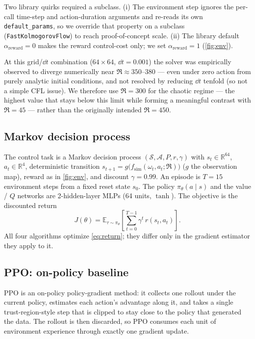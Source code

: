 Two library quirks required a subclass. (i) The environment step ignores the
per-call time-step and action-duration arguments and re-reads its own
\texttt{default\_params}, so we override that property on a subclass
(\texttt{FastKolmogorovFlow}) to reach proof-of-concept scale.
(ii) The library default $\alpha_{\text{reward}}=0$ makes the reward
control-cost only; we set $\alpha_{\text{reward}}=1$ (\cref{fig:env}).

At this grid/$\dd t$ combination ($64\times 64$, $\dd t=0.001$) the solver was
empirically observed to diverge numerically near $\Re\approx 350$--$380$ ---
even under zero action from purely analytic initial conditions, and not
resolved by reducing $\dd t$ tenfold (so not a simple CFL issue). We
therefore use $\Re=300$ for the chaotic regime --- the highest value that
stays below this limit while forming a meaningful contrast with $\Re=45$ ---
rather than the originally intended $\Re=450$.

\subsection{Markov decision process}
\label{sec:mdp}

The control task is a Markov decision process
$(\mathcal{S},\mathcal{A},P,r,\gamma)$ with
$s_t\in\mathbb{R}^{64}$, $a_t\in\mathbb{R}^{4}$, deterministic transition
$s_{t+1}=g\big(f_{\mathrm{sim}}(\omega_t,a_t;\Re)\big)$ ($g$ the observation
map), reward as in \cref{fig:env}, and discount $\gamma=0.99$. An episode is
$T=15$ environment steps from a fixed reset state $s_0$. The policy
$\pi_\theta(a\mid s)$ and the value / $Q$ networks are 2-hidden-layer MLPs
(64 units, $\tanh$). The objective is the discounted return
\begin{equation}
  J(\theta)=\mathbb{E}_{\tau\sim\pi_\theta}\!\left[\textstyle\sum_{t=0}^{T-1}\gamma^{t}\,r(s_t,a_t)\right].
  \label{eq:return}
\end{equation}
All four algorithms optimize \cref{eq:return}; they differ only in the
gradient estimator they apply to it.

\subsection{PPO: on-policy baseline}
\label{sec:ppo}

PPO is an on-policy policy-gradient method: it collects one rollout under
the current policy, estimates each action's advantage along it, and takes a
single trust-region-style step that is clipped to stay close to the policy
that generated the data. The rollout is then discarded, so PPO consumes
each unit of environment experience through exactly one gradient update.

